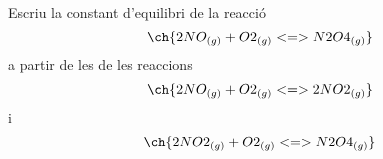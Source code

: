 \begin{exr}
Escriu la constant d'equilibri de la reacció 
\[\ch{2 NO_{(g)} + O2_{(g)} <=> N2O4_{(g)}}\]
a partir de les de les reaccions 
\[\ch{2 NO_{(g)} + O2_{(g)} <=> 2 NO2_{(g)}}\]
i 
\[\ch{2 NO2_{(g)} + O2_{(g)} <=> N2O4_{(g)}}\]
\end{exr}